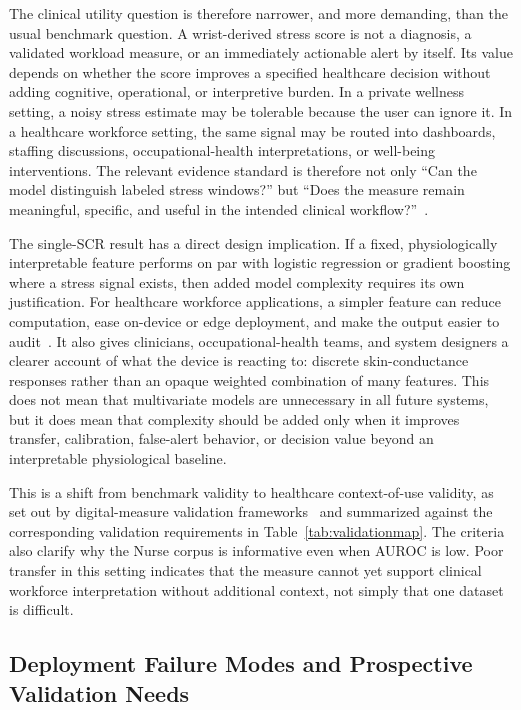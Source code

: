 \documentclass[healthcare,article,submit,moreauthors,pdftex]{Definitions/mdpi}
\begin{document}
The clinical utility question is therefore narrower, and more demanding, than the
usual benchmark question. A wrist-derived stress score is not a diagnosis, a
validated workload measure, or an immediately actionable alert by itself. Its
value depends on whether the score improves a specified healthcare decision
without adding cognitive, operational, or interpretive burden. In a private
wellness setting, a noisy stress estimate may be tolerable because the user can
ignore it. In a healthcare workforce setting, the same signal may be routed into
dashboards, staffing discussions, occupational-health interpretations, or
well-being interventions. The relevant evidence standard is therefore not only
``Can the model distinguish labeled stress windows?'' but ``Does the measure
remain meaningful, specific, and useful in the intended clinical
workflow?''~\cite{goldsack2020v3,manta2020digitalmeasures,vickers2006decisioncurve}.

The single-SCR result has a direct design implication. If a fixed,
physiologically interpretable feature performs on par with logistic regression or
gradient boosting where a stress signal exists, then added model complexity
requires its own justification. For healthcare workforce applications, a simpler
feature can reduce computation, ease on-device or edge deployment, and make the
output easier to audit~\cite{naegelin2023interpretable}. It also gives
clinicians, occupational-health teams, and system designers a clearer account of
what the device is reacting to: discrete skin-conductance responses rather than
an opaque weighted combination of many features. This does not mean that
multivariate models are unnecessary in all future systems, but it does mean that
complexity should be added only when it improves transfer, calibration,
false-alert behavior, or decision value beyond an interpretable physiological
baseline.

This is a shift from benchmark validity to healthcare context-of-use validity,
as set out by digital-measure validation frameworks~\cite{goldsack2020v3,
manta2020digitalmeasures,vancalster2019calibration,vickers2006decisioncurve} and
summarized against the corresponding validation requirements in
Table~\ref{tab:validationmap}. The criteria also clarify why the Nurse corpus is
informative even when AUROC is low. Poor transfer in this setting indicates that
the measure cannot yet support clinical workforce interpretation without
additional context, not simply that one dataset is difficult.

\subsection{Deployment Failure Modes and Prospective Validation Needs}
\end{document}
